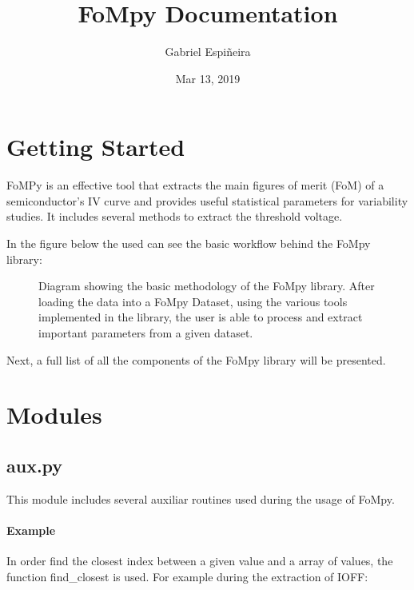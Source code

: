 \documentclass[letterpaper,10pt,english,openany, oneside]{sphinxmanual}
\title{FoMpy Documentation}
\date{Mar 13, 2019}
\author{Gabriel Espiñeira}
\let\sphinxpxdimen\pdfpxdimen\else\newdimen\sphinxpxdimen
\begin{document}
\pagestyle{empty}
\maketitle
\pagestyle{plain}
\sphinxtableofcontents
\pagestyle{normal}
\label{\detokenize{index::doc}}



\chapter{Getting Started}
\label{\detokenize{index:getting-started}}
FoMPy is an effective tool that extracts the main figures of merit (FoM) of a semiconductor’s IV curve and provides useful statistical parameters for variability studies. It includes several methods to extract the threshold voltage.

In the figure below the used can see the basic workflow behind the FoMpy library:

\begin{figure}[htbp]
\centering
\capstart

\noindent\sphinxincludegraphics[width=600\sphinxpxdimen,height=400\sphinxpxdimen]{{simplified_diagram}.jpg}
\caption{Diagram showing the basic methodology of the FoMpy library. After loading the data into a FoMpy Dataset, using the various tools implemented in the library, the user is able to process and extract important parameters from a given dataset.}\label{\detokenize{index:id1}}\end{figure}

Next, a full list of all the components of the FoMpy library will be presented.


\chapter{Modules}
\label{\detokenize{index:module-fompy.aux}}\label{\detokenize{index:modules}}

\section{aux.py}
\label{\detokenize{index:aux-py}}
This module includes several auxiliar routines used during the usage of FoMpy.
\subsubsection*{Example}

In order find the closest index between a given value and a array of values, the function
find\_closest is used. For example during the extraction of IOFF:
\end{document}
